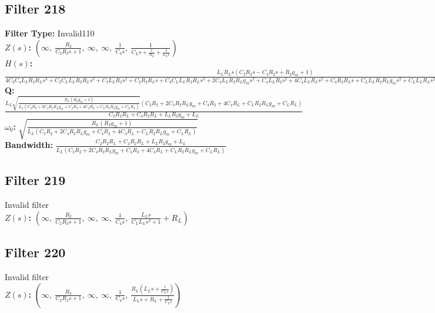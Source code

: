 \documentclass{article}
\begin{document}
\subsection*{Filter 218}
\textbf{Filter Type:} Invalid110 \\ 
\textbf{$Z(s)$:} $\left( \infty, \  \frac{R_{2}}{C_{2} R_{2} s + 1}, \  \infty, \  \infty, \  \frac{1}{C_{4} s}, \  \frac{1}{C_{L} s + \frac{1}{R_{L}} + \frac{1}{L_{L} s}}\right)$ \\ 
\textbf{$H(s)$:} $\frac{L_{L} R_{L} s \left(C_{2} R_{2} s - C_{4} R_{2} s + R_{2} g_{m} + 1\right)}{4 C_{2} C_{4} L_{L} R_{2} R_{L} s^{3} + C_{2} C_{L} L_{L} R_{2} R_{L} s^{3} + C_{2} L_{L} R_{2} s^{2} + C_{2} R_{2} R_{L} s + C_{4} C_{L} L_{L} R_{2} R_{L} s^{3} + 2 C_{4} L_{L} R_{2} R_{L} g_{m} s^{2} + C_{4} L_{L} R_{2} s^{2} + 4 C_{4} L_{L} R_{L} s^{2} + C_{4} R_{2} R_{L} s + C_{L} L_{L} R_{2} R_{L} g_{m} s^{2} + C_{L} L_{L} R_{L} s^{2} + L_{L} R_{2} g_{m} s + L_{L} s + R_{2} R_{L} g_{m} + R_{L}}$ \\ 
\textbf{Q:} $\frac{L_{L} \sqrt{\frac{R_{L} \left(R_{2} g_{m} + 1\right)}{L_{L} \left(C_{2} R_{2} + 2 C_{4} R_{2} R_{L} g_{m} + C_{4} R_{2} + 4 C_{4} R_{L} + C_{L} R_{2} R_{L} g_{m} + C_{L} R_{L}\right)}} \left(C_{2} R_{2} + 2 C_{4} R_{2} R_{L} g_{m} + C_{4} R_{2} + 4 C_{4} R_{L} + C_{L} R_{2} R_{L} g_{m} + C_{L} R_{L}\right)}{C_{2} R_{2} R_{L} + C_{4} R_{2} R_{L} + L_{L} R_{2} g_{m} + L_{L}}$ \\ 
\textbf{$\omega_0$:} $\sqrt{\frac{R_{L} \left(R_{2} g_{m} + 1\right)}{L_{L} \left(C_{2} R_{2} + 2 C_{4} R_{2} R_{L} g_{m} + C_{4} R_{2} + 4 C_{4} R_{L} + C_{L} R_{2} R_{L} g_{m} + C_{L} R_{L}\right)}}$ \\ 
\textbf{Bandwidth:} $\frac{C_{2} R_{2} R_{L} + C_{4} R_{2} R_{L} + L_{L} R_{2} g_{m} + L_{L}}{L_{L} \left(C_{2} R_{2} + 2 C_{4} R_{2} R_{L} g_{m} + C_{4} R_{2} + 4 C_{4} R_{L} + C_{L} R_{2} R_{L} g_{m} + C_{L} R_{L}\right)}$ \\ 
\subsection*{Filter 219}
Invalid filter \\ 
\textbf{$Z(s)$:} $\left( \infty, \  \frac{R_{2}}{C_{2} R_{2} s + 1}, \  \infty, \  \infty, \  \frac{1}{C_{4} s}, \  \frac{L_{L} s}{C_{L} L_{L} s^{2} + 1} + R_{L}\right)$ \\ 
\subsection*{Filter 220}
Invalid filter \\ 
\textbf{$Z(s)$:} $\left( \infty, \  \frac{R_{2}}{C_{2} R_{2} s + 1}, \  \infty, \  \infty, \  \frac{1}{C_{4} s}, \  \frac{R_{L} \left(L_{L} s + \frac{1}{C_{L} s}\right)}{L_{L} s + R_{L} + \frac{1}{C_{L} s}}\right)$ \\ 
\end{document}

